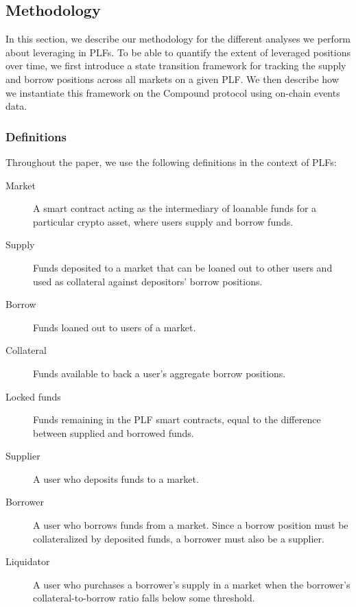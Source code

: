 \subsection{Methodology}
\label{sec:5b:methodology}

In this section, we describe our methodology for the different analyses we perform about leveraging in PLFs.
To be able to quantify the extent of leveraged positions over time, we first introduce a state transition framework for tracking the supply and borrow positions across all markets on a given PLF.
We then describe how we instantiate this framework on the Compound protocol using on-chain events data.

\subsubsection{Definitions}

Throughout the paper, we use the following definitions in the context of PLFs:

\begin{description}
\item[Market] A smart contract acting as the intermediary of loanable funds for a particular crypto asset, where users supply and borrow funds. 

\item[Supply] Funds deposited to a market that can be loaned out to other users and used as collateral against depositors' borrow positions.

\item[Borrow] Funds loaned out to users of a market.

\item[Collateral] Funds available to back a user's aggregate borrow positions.

\item[Locked funds] Funds remaining in the PLF smart contracts, equal to the difference between supplied and borrowed funds.

\item[Supplier] A user who deposits funds to a market.

\item[Borrower] A user who borrows funds from a market. Since a borrow position must be collateralized by deposited funds, a borrower must also be a supplier.

\item[Liquidator] A user who purchases a borrower's supply in a market when the borrower's collateral-to-borrow ratio falls below some threshold.
\end{description}


